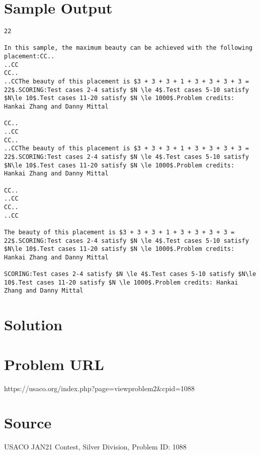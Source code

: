 \documentclass[12pt]{article}
\begin{document}
\section*{Sample Output}
\begin{verbatim}
22

In this sample, the maximum beauty can be achieved with the following placement:CC..
..CC
CC..
..CCThe beauty of this placement is $3 + 3 + 3 + 1 + 3 + 3 + 3 + 3 = 22$.SCORING:Test cases 2-4 satisfy $N \le 4$.Test cases 5-10 satisfy $N\le 10$.Test cases 11-20 satisfy $N \le 1000$.Problem credits: Hankai Zhang and Danny Mittal

CC..
..CC
CC..
..CCThe beauty of this placement is $3 + 3 + 3 + 1 + 3 + 3 + 3 + 3 = 22$.SCORING:Test cases 2-4 satisfy $N \le 4$.Test cases 5-10 satisfy $N\le 10$.Test cases 11-20 satisfy $N \le 1000$.Problem credits: Hankai Zhang and Danny Mittal

CC..
..CC
CC..
..CC

The beauty of this placement is $3 + 3 + 3 + 1 + 3 + 3 + 3 + 3 = 22$.SCORING:Test cases 2-4 satisfy $N \le 4$.Test cases 5-10 satisfy $N\le 10$.Test cases 11-20 satisfy $N \le 1000$.Problem credits: Hankai Zhang and Danny Mittal

SCORING:Test cases 2-4 satisfy $N \le 4$.Test cases 5-10 satisfy $N\le 10$.Test cases 11-20 satisfy $N \le 1000$.Problem credits: Hankai Zhang and Danny Mittal
\end{verbatim}

\section*{Solution}


\section*{Problem URL}
https://usaco.org/index.php?page=viewproblem2&cpid=1088

\section*{Source}
USACO JAN21 Contest, Silver Division, Problem ID: 1088
\end{document}

